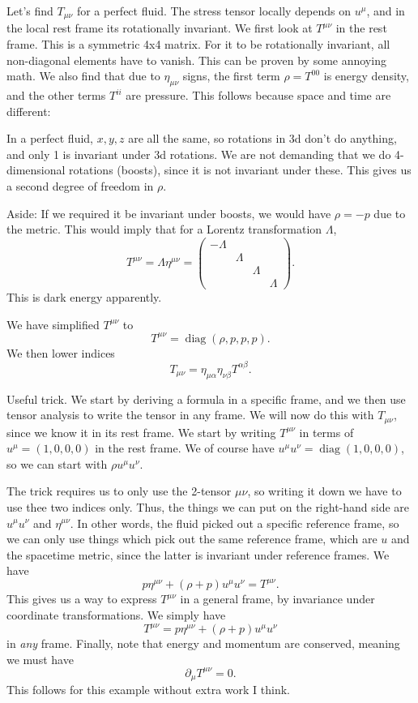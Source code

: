 Let's find $T_{\mu \nu } $ for a perfect fluid. The stress tensor locally depends on $u^\mu $, and in the local rest frame its rotationally invariant. We first look at $T^{\mu \nu } $ in the rest frame. This is a symmetric 4x4 matrix. For it to be rotationally invariant, all non-diagonal elements have to vanish. This can be proven by some annoying math. We also find that due to $\eta _{\mu \nu } $ signs, the first term $\rho =T^{00} $ is energy density, and the other terms $T^{ii} $ are pressure. This follows because space and time are different:

In a perfect fluid, $x,y,z$ are all the same, so rotations in 3d don't do anything, and only 1 is invariant under 3d rotations. We are not demanding that we do 4-dimensional rotations (boosts), since it is not invariant under these. This gives us a second degree of freedom in $\rho $. 

Aside: If we required it be invariant under boosts, we would have $\rho =-p$ due to the metric. This would imply that for a Lorentz transformation $\Lambda $,
\[
	T^{\mu \nu } =\Lambda \eta ^{\mu \nu } =\begin{pmatrix}
	-\Lambda  &  &  &  \\
	 & \Lambda  &  &  \\
	 &  & \Lambda  &  \\
	 &  &  & \Lambda 
	\end{pmatrix}
.\]
This is dark energy apparently.

We have simplified $T^{\mu \nu } $ to
\[
	T^{\mu \nu } =\operatorname{diag} (\rho ,p,p,p)
.\]
We then lower indices
\[
	T_{\mu \nu } =\eta _{\mu \alpha } \eta _{\nu \beta } T^{\alpha \beta } 
.\]


Useful trick. We start by deriving a formula in a specific frame, and we then use tensor analysis to write the tensor in any frame. We will now do this with $T_{\mu \nu } $, since we know it in its rest frame. We start by writing $T^{\mu \nu } $ in terms of $u^\mu =(1,0,0,0)$ in the rest frame. We of course have $u^\mu u^\nu =\operatorname{diag} (1,0,0,0)$, so we can start with $\rho u^\mu u^\nu $.

The trick requires us to only use the 2-tensor $\mu \nu $, so writing it down we have to use thee two indices only. Thus, the things we can put on the right-hand side are $u^\mu u^\nu $ and $\eta ^{\mu \nu } $. In other words, the fluid picked out a specific reference frame, so we can only use things which pick out the same reference frame, which are $u$ and the spacetime metric, since the latter is invariant under reference frames. We have
\[
	p\eta ^{\mu \nu } +(\rho +p)u^\mu u^\nu =T^{\mu \nu } 
.\]
This gives us a way to express $T^{\mu \nu } $ in a general frame, by invariance under coordinate transformations. We simply have
\[
	T^{\mu \nu } =p\eta ^{\mu \nu } +(\rho +p)u^\mu u^\nu 
\]
in \emph{any} frame. Finally, note that energy and momentum are conserved, meaning we must have
\[
	\partial _\mu T^{\mu \nu } =0
.\]
This follows for this example without extra work I think.

